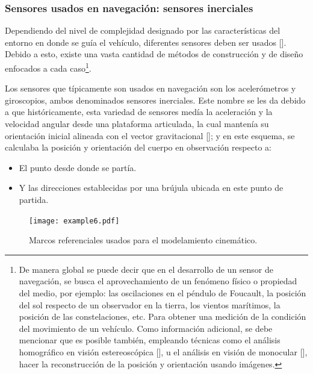 \documentclass[10pt]{report}
\numberwithin{equation}{chapter}
\numberwithin{algorithm}{chapter}
\begin{document}
\subsubsection{Sensores usados en navegación: sensores inerciales}
Dependiendo del nivel de complejidad designado por las características del entorno en donde se guía el vehículo, diferentes sensores deben ser usados [\cite{Bekir2007}]. Debido a esto, existe una vasta cantidad de métodos de construcción y de diseño enfocados a cada caso\footnote{De manera global se puede decir que en el desarrollo de un sensor de navegación, se busca el aprovechamiento de un fenómeno físico o propiedad del medio, por ejemplo: las oscilaciones en el péndulo de Foucault, la posición del sol respecto de un observador en la tierra, los vientos marítimos, la posición de las constelaciones, etc. Para obtener una medición de la condición del movimiento de un vehículo. Como información adicional, se debe mencionar que es posible también, empleando técnicas como el análisis homográfico en visión estereoscópica [\cite{Scandaro2011a,Kim2007}], u el análisis en visión de monocular [\cite{Huster2003}], hacer la reconstrucción de la posición y orientación usando imágenes.}.\par
Los sensores que típicamente son usados en navegación son los acelerómetros y giroscopios, ambos denominados sensores inerciales. Este nombre se les da debido a que históricamente, esta variedad de sensores medía la aceleración y la velocidad angular desde una plataforma articulada, la cual mantenía su orientación inicial alineada con el vector gravitacional [\cite{Bekir2007}]; y en este esquema, se calculaba la posición y orientación del cuerpo en observación respecto a:
\begin{itemize}
\item El punto desde donde se partía.
\item Y las direcciones establecidas por una brújula ubicada en este punto de partida.
\end{itemize}
\begin{figure}[t]
\begin{center}
\texttt{[image: example6.pdf]}
\caption{Marcos referenciales usados para el modelamiento cinemático.}
\label{modelo_fig1}
\end{center}
\end{figure}
\end{document}
